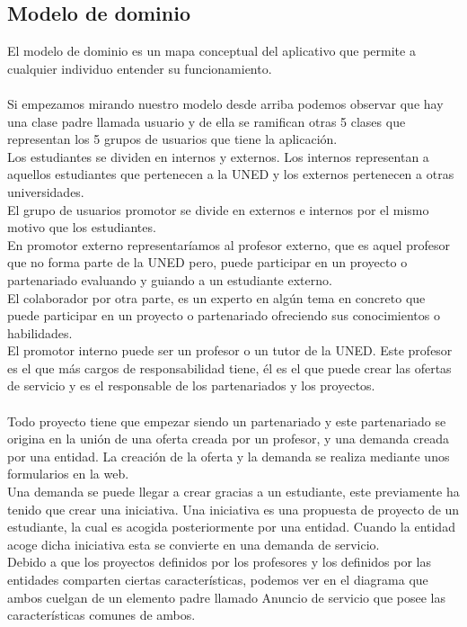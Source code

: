 \documentclass[11pt]{article}
\begin{document}
\subsection{Modelo de dominio}
El modelo de dominio es un mapa conceptual del aplicativo que permite a cualquier individuo entender su funcionamiento.\\\\
Si empezamos mirando nuestro modelo desde arriba podemos observar que hay una clase padre llamada usuario y de ella se ramifican otras 5 clases que representan los 5 grupos de usuarios que tiene la aplicación.\\
Los estudiantes se dividen en internos y externos. Los internos representan a aquellos estudiantes que pertenecen a la UNED y los externos pertenecen a otras universidades.\\
El grupo de usuarios promotor se divide en externos e internos por el mismo motivo que los estudiantes. \\
En promotor externo representaríamos al profesor externo, que es aquel profesor que no forma parte de la UNED pero, puede participar en un proyecto o partenariado evaluando y guiando a un estudiante externo. \\
El colaborador por otra parte, es un experto en algún tema en concreto que puede participar en un proyecto o partenariado ofreciendo sus conocimientos o habilidades.\\
El promotor interno puede ser un profesor o un tutor de la UNED. Este profesor es el que más cargos de responsabilidad tiene, él es el que puede crear las ofertas de servicio y es el responsable de los partenariados y los proyectos.\\\\
Todo proyecto tiene que empezar siendo un partenariado y este partenariado se origina en la unión de una oferta creada por un profesor, y una demanda creada por una entidad. La creación de la oferta y la demanda se realiza mediante unos formularios en la web.\\
Una demanda se puede llegar a crear gracias a un estudiante, este previamente ha tenido que crear una iniciativa. Una iniciativa es una propuesta de proyecto de un estudiante, la cual es acogida posteriormente por una entidad. Cuando la entidad acoge dicha iniciativa esta se convierte en una demanda de servicio.\\
Debido a que los proyectos definidos por los profesores y los definidos por las entidades comparten ciertas características, podemos ver en el diagrama que ambos cuelgan de un elemento padre llamado Anuncio de servicio que posee las características comunes de ambos.
\end{document}
